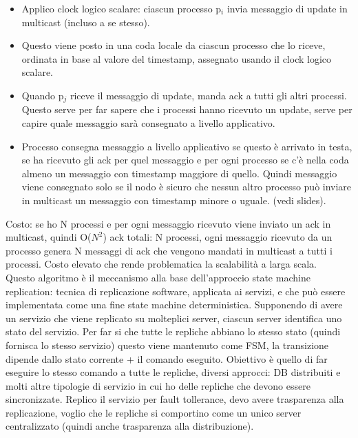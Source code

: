 \documentclass{article}
\begin{document}
\begin{itemize}
\item Applico clock logico scalare: ciascun processo p$_i$ invia messaggio di update in multicast (incluso a se stesso). 
\item Questo viene posto in una coda locale da ciascun processo che lo riceve, ordinata in base al valore del timestamp, assegnato usando il clock logico scalare. 
\item Quando p$_j$ riceve il messaggio di update, manda ack a tutti gli altri processi. Questo serve per far sapere che i processi hanno ricevuto un update, serve per capire quale messaggio sarà consegnato a livello applicativo.
\item Processo consegna messaggio a livello applicativo se questo è arrivato in testa, se ha ricevuto gli ack per quel messaggio e per ogni processo se c'è nella coda almeno un messaggio con timestamp maggiore di quello. Quindi messaggio viene consegnato solo se il nodo è sicuro che nessun altro processo può inviare in multicast un messaggio con timestamp minore o uguale. (vedi slides).
\end{itemize}
Costo: se ho N processi e per ogni messaggio ricevuto viene inviato un ack in multicast, quindi O($N^2$) ack totali: N processi, ogni messaggio ricevuto da un processo genera N messaggi di ack che vengono mandati in multicast a tutti i processi. Costo elevato che rende problematica la scalabilità a larga scala.\\ Questo algoritmo è il meccanismo alla base dell'approccio state machine replication: tecnica di replicazione software, applicata ai servizi, e che può essere implementata come una fine state machine deterministica. Supponendo di avere un servizio che viene replicato su molteplici server, ciascun server identifica uno stato del servizio. Per far si che tutte le repliche abbiano lo stesso stato (quindi fornisca lo stesso servizio) questo viene mantenuto come FSM, la transizione dipende dallo stato corrente + il comando eseguito. Obiettivo è quello di far eseguire lo stesso comando a tutte le repliche, diversi approcci: DB distribuiti e molti altre tipologie di servizio in cui ho delle repliche che devono essere sincronizzate. Replico il servizio per fault tollerance, devo avere trasparenza alla replicazione, voglio che le repliche si comportino come un unico server centralizzato (quindi anche trasparenza alla distribuzione).
\end{document}
